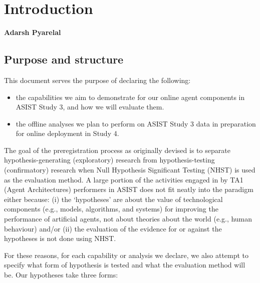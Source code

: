 \chapter{Introduction}
\textbf{Adarsh Pyarelal}

\section{Purpose and structure}

This document serves the purpose of declaring the following:

\begin{itemize}
    \item the capabilities we aim to demonstrate for our online agent
        components in ASIST Study 3, and how we will evaluate them.
    \item the offline analyses we plan to perform on ASIST Study 3 data
        in preparation for online deployment in Study 4.
\end{itemize}


The goal of the preregistration process as originally devised
\citep{Nosek.ea:2018} is to separate hypothesis-generating (exploratory)
research from hypothesis-testing (confirmatory) research when Null Hypothesis
Significant Testing (NHST) is used as the evaluation method. A large portion of
the activities engaged in by TA1 (Agent Architectures) performers in ASIST does
not fit neatly into the paradigm either because: (i) the `hypotheses' are about
the value of technological components (e.g., models, algorithms, and systems)
for improving the performance of artificial agents, not about theories about
the world (e.g., human behaviour) and/or (ii) the evaluation of the evidence
for or against the hypotheses is not done using NHST.

For these reasons, for each capability or analysis we declare, we also attempt
to specify what form of hypothesis is tested and what the evaluation method
will be. Our hypotheses take three forms:

